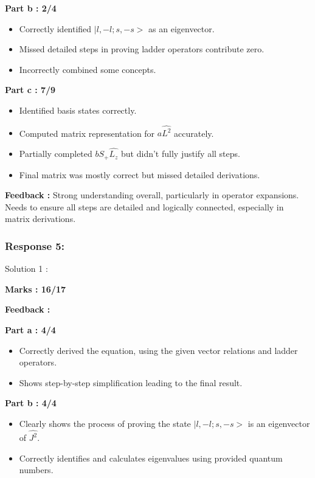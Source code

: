 \documentclass[a4paper,11pt]{article}
\begin{document}
\textbf{Part b : 2/4}

\begin{itemize}
    \item Correctly identified $|l, -l;s, -s>$ as an eigenvector.
    \item Missed detailed steps in proving ladder operators contribute zero.
    \item Incorrectly combined some concepts.
\end{itemize}


\textbf{Part c : 7/9}

\begin{itemize}
    \item Identified basis states correctly.
    \item Computed matrix representation for $a\hat{L^2}$ accurately.
    \item Partially completed $b\hat{S_+}\hat{L_z}$ but didn't fully justify all steps.
    \item Final matrix was mostly correct but missed detailed derivations.
\end{itemize}

\textbf{Feedback :}
Strong understanding overall, particularly in operator expansions. Needs to ensure all steps are detailed and logically connected, especially in matrix derivations.


\subsubsection*{Response 5:}


Solution 1 :

\textbf{Marks : 16/17}

\textbf{Feedback : }

\textbf{Part a : 4/4}

\begin{itemize}
    \item Correctly derived the equation, using the given vector relations and ladder operators.
    \item Shows step-by-step simplification leading to the final result.
\end{itemize}


\textbf{Part b : 4/4}

\begin{itemize}
    \item Clearly shows the process of proving the state $|l, -l;s, -s>$ is an eigenvector of $\hat{J^2}$.
    \item Correctly identifies and calculates eigenvalues using provided quantum numbers.
\end{itemize}
\end{document}
